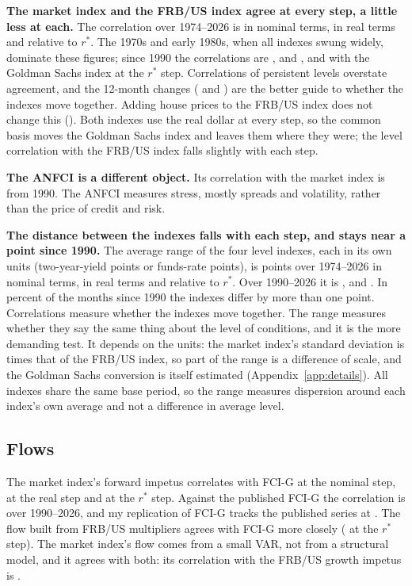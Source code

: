 \documentclass[11pt]{article}
\newcommand{\rs}{r^{*}}
\begin{document}
\textbf{The market index and the FRB/US index agree at every step, a little less at each.} The correlation over 1974--2026 is  in nominal terms,  in real terms and  relative to $\rs$. The 1970s and early 1980s, when all indexes swung widely, dominate these figures; since 1990 the correlations are ,  and , and with the Goldman Sachs index  at the $\rs$ step. Correlations of persistent levels overstate agreement, and the 12-month changes ( and ) are the better guide to whether the indexes move together. Adding house prices to the FRB/US index does not change this (). Both indexes use the real dollar at every step, so the common basis moves the Goldman Sachs index and leaves them where they were; the level correlation with the FRB/US index falls slightly with each step.

\textbf{The ANFCI is a different object.} Its correlation with the market index is  from 1990. The ANFCI measures stress, mostly spreads and volatility, rather than the price of credit and risk.

\textbf{The distance between the indexes falls with each step, and stays near a point since 1990.} The average range of the four level indexes, each in its own units (two-year-yield points or funds-rate points), is  points over 1974--2026 in nominal terms,  in real terms and  relative to $\rs$. Over 1990--2026 it is ,  and . In  percent of the months since 1990 the indexes differ by more than one point. Correlations measure whether the indexes move together. The range measures whether they say the same thing about the level of conditions, and it is the more demanding test. It depends on the units: the market index's standard deviation is  times that of the FRB/US index, so part of the range is a difference of scale, and the Goldman Sachs conversion is itself estimated (Appendix~\ref{app:details}). All indexes share the same base period, so the range measures dispersion around each index's own average and not a difference in average level.

\subsection{Flows}\label{sec:flows}
The market index's forward impetus correlates  with FCI-G at the nominal step,  at the real step and  at the $\rs$ step. Against the published FCI-G the correlation is  over 1990--2026, and my replication of FCI-G tracks the published series at . The flow built from FRB/US multipliers agrees with FCI-G more closely ( at the $\rs$ step). The market index's flow comes from a small VAR, not from a structural model, and it agrees with both: its correlation with the FRB/US growth impetus is .
\end{document}

